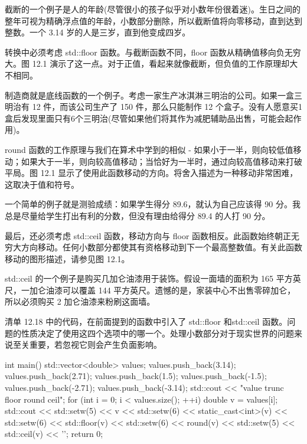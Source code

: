 
截断的一个例子是人的年龄(尽管很小的孩子似乎对小数年份很着迷)。生日之间的整年可视为精确浮点值的年龄，小数部分删除，所以截断值将向零移动，直到达到整数。一个 3.14 岁的人是三岁，直到他变成四岁。

转换中必须考虑 std::floor 函数。与截断函数不同，floor 函数从精确值移向负无穷大。图 12.1 演示了这一点。对于正值，看起来就像截断，但负值的工作原理却大不相同。

制造商就是底线函数的一个例子。考虑一家生产冰淇淋三明治的公司。如果一盒三明治有 12 件，而该公司生产了 150 件，那么只能制作 12 个盒子。没有人愿意买1盒后发现里面只有6个三明治(尽管如果他们将其作为减肥辅助品出售，可能会起作用)。

round 函数的工作原理与我们在算术中学到的相似 - 如果小于一半，则向较低值移动；如果大于一半，则向较高值移动；当恰好为一半时，通过向较高值移动来打破平局。图 12.1 显示了使用此函数移动的方向。将舍入描述为一种移动非常困难，这取决于值和符号。

一个简单的例子就是测验成绩：如果学生得分 89.6，就认为自己应该得 90 分。我总是尽量给学生打出有利的分数，但没有理由给得分 89.4 的人打 90 分。

最后，还必须考虑 std::ceil 函数，移动方向与 floor 函数相反。此函数始终朝正无穷大方向移动。任何小数部分都使其有资格移动到下一个最高整数值。有关此函数移动的图形描述，请参见图 12.1。

std::ceil 的一个例子是购买几加仑油漆用于装饰。假设一面墙的面积为 165 平方英尺，一加仑油漆可以覆盖 144 平方英尺。遗憾的是，家装中心不出售零碎加仑，所以必须购买 2 加仑油漆来粉刷这面墙。

清单 12.18 中的代码，在前面提到的函数中引入了 std::floor 和std::ceil 函数。问题的性质决定了使用这四个选项中的哪一个。处理小数部分对于现实世界的问题来说至关重要，若忽视它则会产生负面影响。


\begin{cpp}
int main() {
  std::vector<double> values;
  values.push_back(3.14); values.push_back(2.71); values.push_back(1.5);
  values.push_back(-1.5); values.push_back(-2.71);
  values.push_back(-3.14);
  std::cout << "value trunc floor round ceil\n";
  for (int i = 0; i < values.size(); ++i) {
    double v = values[i];
    std::cout << std::setw(5) << v
      << std::setw(6) << static_cast<int>(v)
      << std::setw(6) << std::floor(v)
      << std::setw(6) << round(v)
      << std::setw(5) << std::ceil(v)
      << '\n';
  }
  return 0;
}
\end{cpp}

